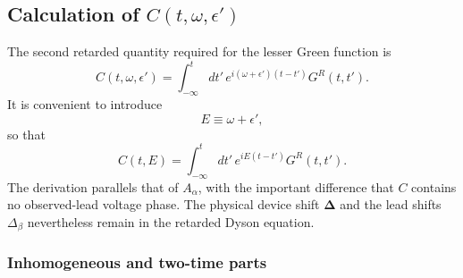 \documentclass[
 reprint,
 superscriptaddress,
 amsmath,amssymb,
 aps,prb,
 longbibliography,
 floatfix
]{revtex4-2}
\begin{document}
\subsection{Calculation of $C(t,\omega,\epsilon')$}
\label{sec:up-C}

The second retarded quantity required for the lesser Green function is
\begin{equation*}
C(t,\omega,\epsilon')
=
\int_{-\infty}^{t}dt'\,
e^{i(\omega+\epsilon')(t-t')}
G^R(t,t').
\end{equation*}
It is convenient to introduce
\begin{equation*}
E\equiv\omega+\epsilon',
\end{equation*}
so that
\begin{equation}
C(t,E)
=
\int_{-\infty}^{t}dt'\,
e^{iE(t-t')}
G^R(t,t').
\label{eq:Cup-definition-E}
\end{equation}
The derivation parallels that of $A_\alpha$, with the important difference that $C$ contains no observed-lead voltage phase. The physical device shift $\bm\Delta$ and the lead shifts $\Delta_\beta$ nevertheless remain in the retarded Dyson equation.

\subsubsection{Inhomogeneous and two-time parts}
\end{document}
